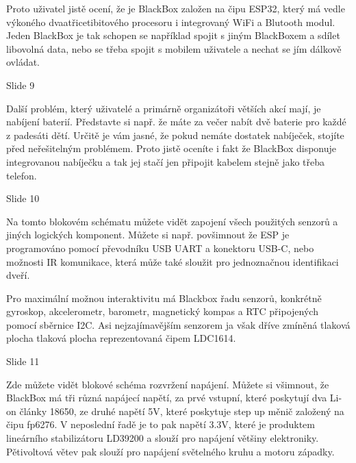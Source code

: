 Proto uživatel jistě ocení, že je BlackBox založen na čipu ESP32, 
který má vedle výkoného dvaatřicetibitového procesoru i integrovaný WiFi a Blutooth modul. 
Jeden BlackBox je tak schopen se například spojit s jiným BlackBoxem a sdílet libovolná data, 
nebo se třeba spojit s mobilem uživatele a nechat se jím dálkově ovládat. %

Slide 9

Další problém, který uživatelé a primárně organizátoři větších akcí mají, je nabíjení baterií. 
Představte si např. že máte za večer nabít dvě baterie pro každé z padesáti dětí. Určitě je vám jasné, že pokud 
nemáte dostatek nabíječek, stojíte před neřešitelným problémem.
Proto jistě oceníte i fakt že BlackBox disponuje integrovanou nabíječku a tak jej stačí 
jen připojit kabelem stejně jako třeba telefon.



Slide 10

Na tomto blokovém schématu můžete vidět zapojení všech použitých senzorů a jiných logických komponent.
Můžete si např. povšimnout že ESP je programováno pomocí převodníku USB UART a konektoru USB-C,
nebo možnosti IR komunikace, která může také sloužit pro jednoznačnou identifikaci dveří. 

Pro maximální možnou interaktivitu má Blackbox řadu senzorů, 
konkrétně gyroskop, akcelerometr, barometr, magnetický kompas a RTC připojených pomocí sběrnice I2C. 
Asi nejzajímavějším senzorem ja však dříve zmíněná tlaková plocha tlaková plocha reprezentovaná čipem LDC1614. 




Slide 11

Zde můžete vidět blokové schéma rozvržení napájení.
Můžete si všimnout, že BlackBox má tři různá napájecí napětí, za prvé vstupní, 
které poskytují dva Li-on články 18650, 
ze druhé napětí 5V, které poskytuje step up měnič založený na čipu fp6276. 
V neposlední řadě je to pak napětí 3.3V,
které je produktem lineárního stabilizátoru LD39200 a slouží pro napájení většiny elektroniky.
Pětivoltová větev pak slouží pro napájení světelného kruhu a motoru západky.

